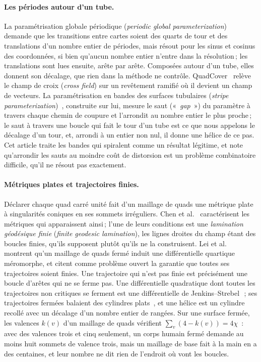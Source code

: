 \documentclass[11pt,a4paper]{article}
\begin{document}
\paragraph{Les périodes autour d'un tube.}
La paramétrisation globale périodique (\emph{periodic global
parameterization})~\cite{ray2006periodic} demande que les transitions entre
cartes soient des quarts de tour et des translations d'un nombre entier de
périodes, mais résout pour les sinus et cosinus des coordonnées, si bien
qu'aucun nombre entier n'entre dans la résolution\,; les translations sont
lues ensuite, arête par arête. Composées autour d'un tube, elles donnent son
décalage, que rien dans la méthode ne contrôle. QuadCover~\cite{kalberer2007quadcover} relève le champ de croix (\emph{cross
field}) sur un revêtement ramifié où il devient un champ de vecteurs. La
paramétrisation en bandes des surfaces tubulaires (\emph{stripe
parameterization})~\cite{kalberer2011stripe}, construite sur lui, mesure le
saut («~\emph{gap}~») du paramètre à travers chaque chemin de coupure et
l'arrondit au nombre entier le plus proche\,; le saut à travers une boucle
qui fait le tour d'un tube est ce que nous appelons le décalage d'un tour,
et, arrondi à un entier non nul, il donne une hélice de ce pas. Cet article
traite les bandes qui spiralent comme un résultat légitime, et note
qu'arrondir les sauts au moindre coût de distorsion est un problème
combinatoire difficile, qu'il ne résout pas exactement.

\paragraph{Métriques plates et trajectoires finies.}
Déclarer chaque quad carré unité fait d'un maillage de quads une métrique
plate à singularités coniques en ses sommets irréguliers. Chen et
al.~\cite{chen2019metric} caractérisent les métriques qui apparaissent ainsi\,;
l'une de leurs conditions est une \emph{lamination géodésique finie}
(\emph{finite geodesic lamination}), les lignes droites du champ étant des
boucles finies, qu'ils supposent plutôt qu'ils ne la construisent. Lei et
al.~\cite{lei2020quartic} montrent qu'un maillage de quads fermé induit une
différentielle quartique méromorphe, et citent comme problème ouvert la
garantie que toutes ses trajectoires soient finies. Une trajectoire qui
n'est pas finie est précisément une boucle d'arêtes qui ne se ferme pas. Une
différentielle quadratique dont toutes les trajectoires non critiques se
ferment est une différentielle de
Jenkins--Strebel~\cite[\S20.1]{strebel1984quadratic}\,; ses trajectoires
fermées balaient des cylindres plats~\cite[\S\S9.3, 20.2]{strebel1984quadratic},
et une hélice est un
cylindre recollé avec un décalage d'un nombre entier de rangées. Sur une
surface fermée, les valences $k(v)$ d'un maillage de quads vérifient
$\sum_v (4 - k(v)) = 4\chi$~: avec des valences trois et cinq seulement, un
corps humain fermé demande au moins huit sommets de valence trois, mais un
maillage de base fait à la main en a des centaines, et leur nombre ne dit
rien de l'endroit où vont les boucles.
\end{document}
